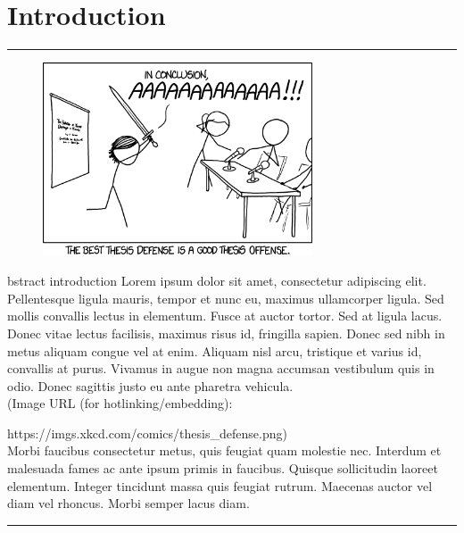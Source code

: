 
%
\chapter{Introduction}

\noindent \rule{\textwidth}{0.5pt}

\begin{figure}
\centering
\includegraphics[width=8cm]{logos/thesisdefense.png}
\end{figure}
\color{gray} \color{black}bstract introduction Lorem ipsum dolor sit amet, consectetur adipiscing elit. Pellentesque ligula mauris, tempor et nunc eu, maximus ullamcorper ligula. Sed mollis convallis lectus in elementum. Fusce at auctor tortor. Sed at ligula lacus. Donec vitae lectus facilisis, maximus risus id, fringilla sapien. Donec sed nibh in metus aliquam congue vel at enim. Aliquam nisl arcu, tristique et varius id, convallis at purus. Vivamus in augue non magna accumsan vestibulum quis in odio. Donec sagittis justo eu ante pharetra vehicula. \\


(Image URL (for hotlinking/embedding):

 https://imgs.xkcd.com/comics/thesis\_defense.png)\\


Morbi faucibus consectetur metus, quis feugiat quam molestie nec. Interdum et malesuada fames ac ante ipsum primis in faucibus. Quisque sollicitudin laoreet elementum. Integer tincidunt massa quis feugiat rutrum. Maecenas auctor vel diam vel rhoncus. Morbi semper lacus diam. 


\noindent \rule{\textwidth}{0.5pt}

